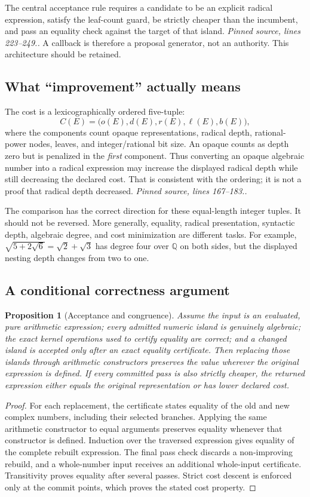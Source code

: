 \documentclass[11pt,a4paper]{article}
\newcommand{\code}[1]{\texttt{\detokenize{#1}}}
\newcommand{\Q}{\mathbb Q}\newcommand{\R}{\mathbb R}\newcommand{\C}{\mathbb C}
\newcommand{\src}[1]{\textit{Pinned source, lines #1.}}
\newtheorem{proposition}[theorem]{Proposition}
\theoremstyle{remark}\newtheorem{remark}[theorem]{Remark}
\begin{document}
The central acceptance rule requires a candidate to be an explicit radical expression, satisfy the leaf-count guard, be strictly cheaper than the incumbent, and pass an equality check against the target of that island. \src{223--249.} A callback is therefore a proposal generator, not an authority. This architecture should be retained.

\subsection{What ``improvement'' actually means}
The cost is a lexicographically ordered five-tuple:
\[
 C(E)=\bigl(o(E),d(E),r(E),\ell(E),b(E)\bigr),
\]
where the components count opaque representations, radical depth, rational-power nodes, leaves, and integer/rational bit size. An opaque \code{Root} counts as depth zero but is penalized in the \emph{first} component. Thus converting an opaque algebraic number into a radical expression may increase the displayed radical depth while still decreasing the declared cost. That is consistent with the ordering; it is not a proof that radical depth decreased. \src{167--183.}

The comparison \code{Order[RadicalCost[new], RadicalCost[old]] === 1} has the correct direction for these equal-length integer tuples. It should not be reversed. More generally, equality, radical presentation, syntactic depth, algebraic degree, and cost minimization are different tasks. For example, $\sqrt{5+2\sqrt6}=\sqrt2+\sqrt3$ has degree four over $\Q$ on both sides, but the displayed nesting depth changes from two to one.\cite{report,bfht}

\subsection{A conditional correctness argument}
\begin{proposition}[Acceptance and congruence]
Assume the input is an evaluated, pure arithmetic expression; every admitted numeric island is genuinely algebraic; the exact kernel operations used to certify equality are correct; and a changed island is accepted only after an exact equality certificate. Then replacing those islands through arithmetic constructors preserves the value wherever the original expression is defined. If every committed pass is also strictly cheaper, the returned expression either equals the original representation or has lower declared cost.
\end{proposition}
\begin{proof}
For each replacement, the certificate states equality of the old and new complex numbers, including their selected branches. Applying the same arithmetic constructor to equal arguments preserves equality whenever that constructor is defined. Induction over the traversed expression gives equality of the complete rebuilt expression. The final pass check discards a non-improving rebuild, and a whole-number input receives an additional whole-input certificate. Transitivity proves equality after several passes. Strict cost descent is enforced only at the commit points, which proves the stated cost property.
\end{proof}
\end{document}
